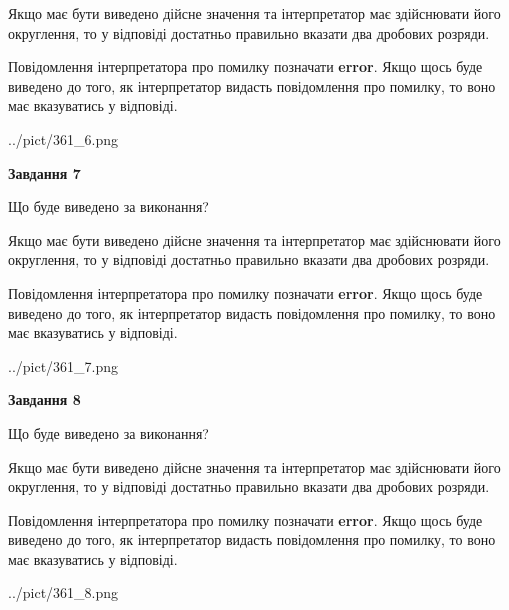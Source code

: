 \documentclass[12pt, ukrainian]{article}
\begin{document}
{\begin {Large}
Якщо має бути виведено дійсне значення та інтерпретатор має здійснювати його округлення, 
то у відповіді достатньо правильно вказати два дробових розряди.

Повідомлення інтерпретатора про помилку позначати \textbf{error}.
Якщо щось буде виведено до того, як інтерпретатор видасть повідомлення про помилку, 
то воно має вказуватись у відповіді. \par

\begin{center}
	{../pict/361_6.png}
\end{center}
\newpage

{\begin {center}\textbf{Завдання 7}\end {center}}\par
Що буде виведено за виконання? \par

Якщо має бути виведено дійсне значення та інтерпретатор має здійснювати його округлення, 
то у відповіді достатньо правильно вказати два дробових розряди.

Повідомлення інтерпретатора про помилку позначати \textbf{error}.
Якщо щось буде виведено до того, як інтерпретатор видасть повідомлення про помилку, 
то воно має вказуватись у відповіді. \par

\begin{center}
	{../pict/361_7.png}
\end{center}
\newpage

{\begin {center}\textbf{Завдання 8}\end {center}}\par
Що буде виведено за виконання? \par

Якщо має бути виведено дійсне значення та інтерпретатор має здійснювати його округлення, 
то у відповіді достатньо правильно вказати два дробових розряди.

Повідомлення інтерпретатора про помилку позначати \textbf{error}.
Якщо щось буде виведено до того, як інтерпретатор видасть повідомлення про помилку, 
то воно має вказуватись у відповіді. \par

\begin{center}
	{../pict/361_8.png}
\end{center}
\newpage


\end{Large}}
\end{document}
